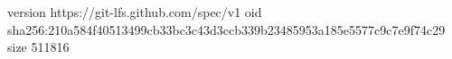 version https://git-lfs.github.com/spec/v1
oid sha256:210a584f40513499cb33bc3c43d3ccb339b23485953a185e5577c9c7e9f74c29
size 511816

